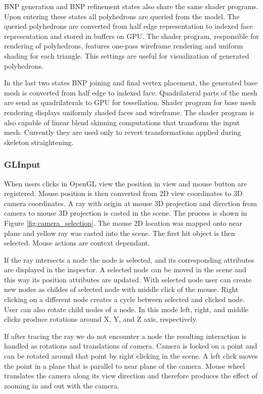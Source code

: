 BNP generation and BNP refinement states also share the same shader programs.
Upon entering these states all polyhedrons are queried from the model.
The queried polyhedrons are converted from half edge representation to indexed face representation and stored in buffers on GPU.
The shader program, responsible for rendering of polyhedrons, features one-pass wireframe rendering and uniform shading for each triangle.
This settings are useful for visualization of generated polyhedrons.

In the last two states BNP joining and final vertex placement, the generated base mesh is converted from half edge to indexed face.
Quadrilateral parts of the mesh are send as quadrilaterals to GPU for tessellation.
Shader program for base mesh rendering displays uniformly shaded faces and wireframe.
The shader program is also capable of linear blend skinning computations that transform the input mesh.
Currently they are used only to revert transformations applied during skeleton straightening.

\subsubsection{GLInput}

When users clicks in OpenGL view the position in view and mouse button are registered.
Mouse position is then converted from 2D view coordinates to 3D camera coordinates.
A ray with origin at mouse 3D projection and direction from camera to mouse 3D projection is casted in the scene.
The process is shown in Figure \ref{fig:camera_selection}.
The mouse 2D location was mapped onto near plane and yellow ray was casted into the scene.
The first hit object is then selected.
Mouse actions are context dependant.

If the ray intersects a node the node is selected, and its corresponding attributes are displayed in the inspector.
A selected node can be moved in the scene and this way its position attributes are updated.
With selected node user can create new nodes as childes of selected node with middle click of the mouse.
Right clicking on a different node creates a cycle between selected and clicked node.
User can also rotate child nodes of a node.
In this mode left, right, and middle clicks produce rotations around X, Y, and Z axis, respectively.

If after tracing the ray we do not encounter a node the resulting interaction is handled as rotations and translations of camera.
Camera is locked on a point and can be rotated around that point by right clicking in the scene.
A left click moves the point in a plane that is parallel to near plane of the camera.
Mouse wheel translates the camera along its view direction and therefore produces the effect of zooming in and out with the camera.


